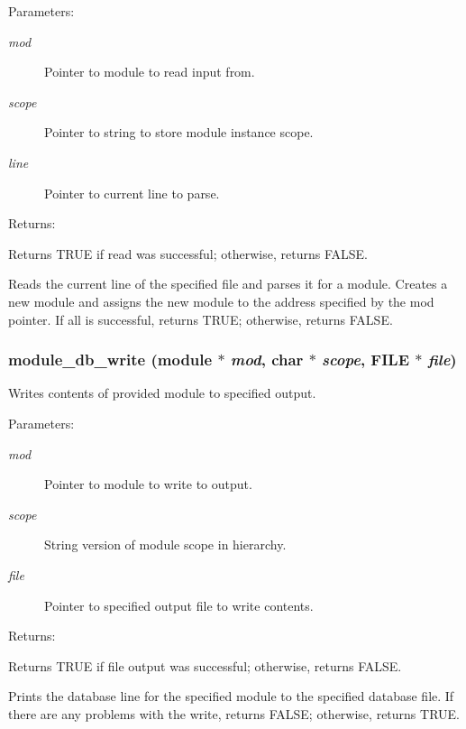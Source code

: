 \begin{Desc}
\item[Parameters: ]\par
\begin{description}
\item[{\em 
mod}]Pointer to module to read input from. \item[{\em 
scope}]Pointer to string to store module instance scope. \item[{\em 
line}]Pointer to current line to parse. \end{description}
\end{Desc}
\begin{Desc}
\item[Returns: ]\par
Returns TRUE if read was successful; otherwise, returns FALSE.\end{Desc}
Reads the current line of the specified file and parses it for a module. Creates a new module and assigns the new module to the address specified by the mod pointer. If all is successful, returns TRUE; otherwise, returns FALSE. 
\subsubsection{ module\_\-db\_\-write ({\bf module} $\ast$ {\em mod}, char $\ast$ {\em scope}, FILE $\ast$ {\em file})}\label{module_8h_a3}


Writes contents of provided module to specified output.

\begin{Desc}
\item[Parameters: ]\par
\begin{description}
\item[{\em 
mod}]Pointer to module to write to output. \item[{\em 
scope}]String version of module scope in hierarchy. \item[{\em 
file}]Pointer to specified output file to write contents. \end{description}
\end{Desc}
\begin{Desc}
\item[Returns: ]\par
Returns TRUE if file output was successful; otherwise, returns FALSE.\end{Desc}
Prints the database line for the specified module to the specified database file. If there are any problems with the write, returns FALSE; otherwise, returns TRUE. 
